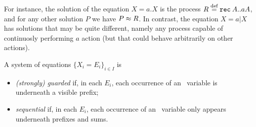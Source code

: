 

For instance, the solution of the equation 
$ X = a. X$ 
is  the process
$R \stackrel{\mbox{\scriptsize def}}{=} {\tt rec}\: A . . a A$, and   for any other solution $P$ we have $P \approx R$.
In contrast, the equation 
 $X = a|  X$ has solutions that may be quite different, namely any process capable of
continuosly  performing $a$ action (but that could behave arbitrarily  on other actions). 

 



\begin{definition}
A system of equations 
$\{  X_i = E_i\}_{i\in I}$
 is 
\begin{itemize}
\item
\emph{(strongly) guarded} if,  in each    $E_i$, each occurrence of
an \behav\  variable is underneath a visible prefix;

\item 
 \emph{sequential} if,  in each    $E_i$, each occurrence of
an \behav\  variable only appears  underneath prefixes and sums.
\end{itemize}
 \end{definition}


